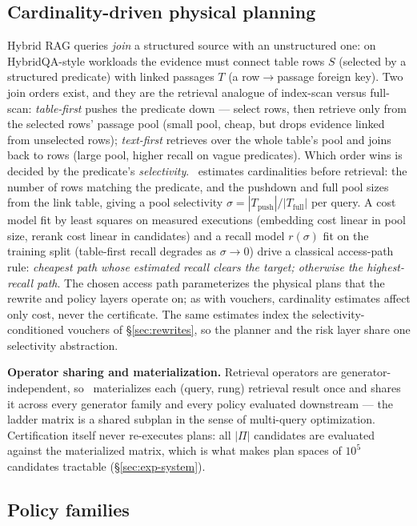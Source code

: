 \subsection{Cardinality-driven physical planning}
\label{sec:planner}

Hybrid RAG queries \emph{join} a structured source with an unstructured
one: on HybridQA-style workloads the evidence must connect table rows $S$
(selected by a structured predicate) with linked passages $T$ (a
row$\to$passage foreign key). Two join orders exist, and they are the
retrieval analogue of index-scan versus full-scan:
\emph{table-first} pushes the predicate down --- select rows, then
retrieve only from the selected rows' passage pool (small pool, cheap,
but drops evidence linked from unselected rows); \emph{text-first}
retrieves over the whole table's pool and joins back to rows (large pool,
higher recall on vague predicates). Which order wins is decided by the
predicate's \emph{selectivity}. \system\ estimates cardinalities before
retrieval: the number of rows matching the predicate, and the pushdown
and full pool sizes from the link table, giving a pool selectivity
$\sigma = |T_{\mathrm{push}}| / |T_{\mathrm{full}}|$ per query. A cost
model fit by least squares on measured executions (embedding cost linear
in pool size, rerank cost linear in candidates) and a recall model
$r(\sigma)$ fit on the training split (table-first recall degrades as
$\sigma \to 0$) drive a classical access-path rule: \emph{cheapest path
whose estimated recall clears the target; otherwise the highest-recall
path}. The chosen access path parameterizes the physical plans that the
rewrite and policy layers operate on; as with vouchers, cardinality
estimates affect only cost, never the certificate. The same estimates
index the selectivity-conditioned vouchers of \S\ref{sec:rewrites}, so
the planner and the risk layer share one selectivity abstraction.

\textbf{Operator sharing and materialization.} Retrieval operators are
generator-independent, so \system\ materializes each (query, rung)
retrieval result once and shares it across every generator family and
every policy evaluated downstream --- the ladder matrix is a shared
subplan in the sense of multi-query optimization. Certification itself
never re-executes plans: all $|\Pi|$ candidates are evaluated against the
materialized matrix, which is what makes plan spaces of $10^5$ candidates
tractable (\S\ref{sec:exp-system}).

\subsection{Policy families}
\label{sec:families}

